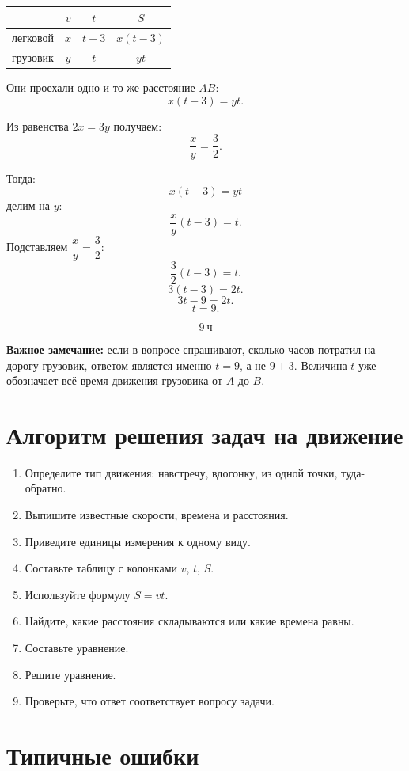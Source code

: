\documentclass[a4paper,12pt]{article}
\newcommand{\important}[1]{\textcolor{darkaccent}{\textbf{#1}}}
\newcommand{\ch}{\text{ч}}
\begin{document}
\begin{center}
\renewcommand{\arraystretch}{1.35}
\begin{tabularx}{0.75\linewidth}{X c c c}
\toprule
 & $v$ & $t$ & $S$ \\
\midrule
легковой & $x$ & $t-3$ & $x(t-3)$ \\
грузовик & $y$ & $t$ & $yt$ \\
\bottomrule
\end{tabularx}
\end{center}

Они проехали одно и то же расстояние $AB$:
\[
x(t-3)=yt.
\]

Из равенства $2x=3y$ получаем:
\[
\frac{x}{y}=\frac{3}{2}.
\]

Тогда:
\[
x(t-3)=yt
\]
делим на $y$:
\[
\frac{x}{y}(t-3)=t.
\]
Подставляем $\dfrac{x}{y}=\dfrac{3}{2}$:
\[
\frac{3}{2}(t-3)=t.
\]
\[
3(t-3)=2t.
\]
\[
3t-9=2t.
\]
\[
t=9.
\]

\[
\boxed{9\ \ch}
\]

\important{Важное замечание:} если в вопросе спрашивают, сколько часов потратил на дорогу грузовик, ответом является именно $t=9$, а не $9+3$. Величина $t$ уже обозначает всё время движения грузовика от $A$ до $B$.

\section{Алгоритм решения задач на движение}

\begin{enumerate}
    \item Определите тип движения: навстречу, вдогонку, из одной точки, туда-обратно.
    \item Выпишите известные скорости, времена и расстояния.
    \item Приведите единицы измерения к одному виду.
    \item Составьте таблицу с колонками $v$, $t$, $S$.
    \item Используйте формулу $S=vt$.
    \item Найдите, какие расстояния складываются или какие времена равны.
    \item Составьте уравнение.
    \item Решите уравнение.
    \item Проверьте, что ответ соответствует вопросу задачи.
\end{enumerate}

\section{Типичные ошибки}
\end{document}
